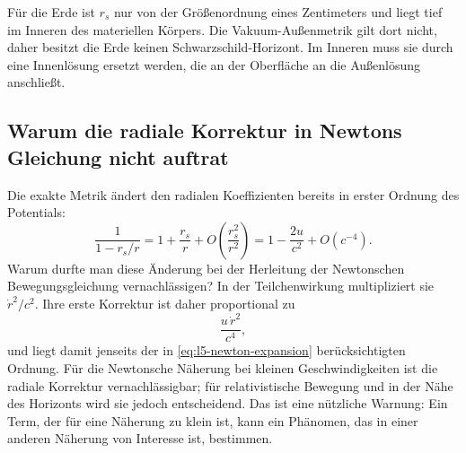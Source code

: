 \begin{classroomqa}
\end{classroomqa}

Für die Erde ist \(r_s\) nur von der Größenordnung eines Zentimeters und liegt tief im Inneren des materiellen Körpers. Die Vakuum-Außenmetrik gilt dort nicht, daher besitzt die Erde keinen Schwarzschild-Horizont. Im Inneren muss sie durch eine Innenlösung ersetzt werden, die an der Oberfläche an die Außenlösung anschließt.

\begin{classroomqa}
\end{classroomqa}

\subsection{Warum die radiale Korrektur in Newtons Gleichung nicht auftrat}

Die exakte Metrik ändert den radialen Koeffizienten bereits in erster Ordnung des Potentials:
\begin{equation}
\frac{1}{1-r_s/r}
=1+\frac{r_s}{r}
+O\!\left(\frac{r_s^2}{r^2}\right)
=1-\frac{2u}{c^2}+O(c^{-4}).
\label{eq:l5-radial-expansion}
\end{equation}
Warum durfte man diese Änderung bei der Herleitung der Newtonschen Bewegungsgleichung vernachlässigen? In der Teilchenwirkung multipliziert sie \(\dot r^2/c^2\). Ihre erste Korrektur ist daher proportional zu
\begin{equation}
\frac{u\,\dot r^2}{c^4},
\end{equation}
und liegt damit jenseits der in \eqref{eq:l5-newton-expansion} berücksichtigten Ordnung. Für die Newtonsche Näherung bei kleinen Geschwindigkeiten ist die radiale Korrektur vernachlässigbar; für relativistische Bewegung und in der Nähe des Horizonts wird sie jedoch entscheidend. Das ist eine nützliche Warnung: Ein Term, der für eine Näherung zu klein ist, kann ein Phänomen, das in einer anderen Näherung von Interesse ist, bestimmen.

